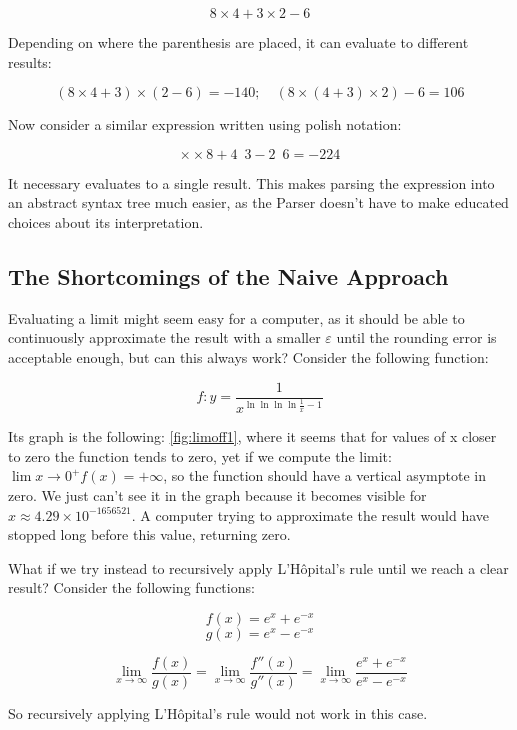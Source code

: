 \documentclass{article}
\theoremstyle{plain}
\theoremstyle{definition}
\begin{document}
	\[
	    8 \times 4 + 3 \times  2 - 6
	\]
	
	Depending on where the parenthesis are placed, it can evaluate to different results:
	
	\[
	    (8 \times 4 + 3) \times (2 - 6) = -140; \quad (8 \times (4 + 3) \times 2) - 6 = 106 
	\]
	
	Now consider a similar expression written using polish notation:
	
	\[
	    \times \times 8 + 4 \enspace 3 - 2 \enspace 6 = -224
	\]
	
	It necessary evaluates to a single result.
	This makes parsing the expression into an abstract syntax tree much easier, as the Parser doesn't have to make educated choices about its interpretation.
	
	\subsection{The Shortcomings of the Naive Approach}
	
	Evaluating a limit might seem easy for a computer, as it should be able to continuously approximate the result with a smaller $\varepsilon$ until the rounding error is acceptable enough, but can this always work?
	Consider the following function:
	
	\[
	    f : y = \frac{1}{x^{\ln{\ln{\ln{\ln{\frac{1}{x}}}}}-1}} \tag{1.3} \label{eq:toinfinity}
	\]
	
	Its graph is the following: \cref{fig:limoff1}, where it seems that for values of x closer to zero the function tends to zero, yet if we compute the limit: \(\lim{x \to 0^{+}}{f(x) = +\infty}\), so the function should have a vertical asymptote in zero. We just can't see it in the graph because it becomes visible for \(x \approx 4.29 \times 10 ^{-1656521}\). A computer trying to approximate the result would have stopped long before this value, returning zero.
	
	What if we try instead to recursively apply L'Hôpital's rule \cite{wiki:hopital} until we reach a clear result?
	Consider the following functions:
	
	\[
	    f(x) = e^{x} + e^{-x}
	    \] 
	    \[
	    g(x) = e^{x} - e^{-x}
    \]
    
    \[
        \lim_{x \to \infty}{\frac{f(x)}{g(x)}} = \lim_{x \to \infty}{\frac{f''(x)}{g''(x)}} = \lim_{x \to \infty}{\frac{e^{x} + e^{-x}}{e^{x} - e^{-x}}}
    \]
	
	So recursively applying L'Hôpital's rule would not work in this case.
	
\end{document}
